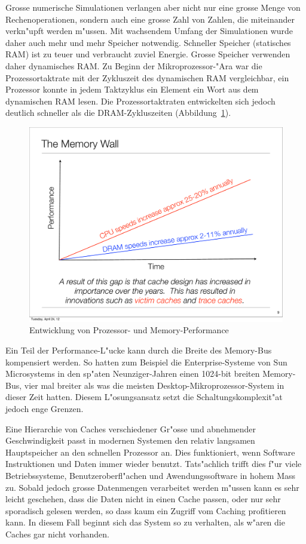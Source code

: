 Grosse numerische Simulationen verlangen aber nicht nur eine grosse
Menge von Rechenoperationen, sondern auch eine grosse Zahl von
Zahlen, die miteinander verkn"upft werden m"ussen.
Mit wachsendem Umfang der Simulationen wurde daher auch mehr
und mehr Speicher notwendig. Schneller Speicher (statisches RAM) ist
zu teuer und verbraucht zuviel Energie. Grosse Speicher verwenden
daher dynamisches RAM. Zu Beginn der Mikroprozessor-"Ara war
die Prozessortaktrate mit der Zykluszeit des dynamischen RAM
vergleichbar, ein Prozessor konnte in jedem Taktzyklus ein
Element ein Wort aus dem dynamischen RAM lesen. Die Prozessortaktraten
entwickelten sich jedoch deutlich schneller als die DRAM-Zykluszeiten
(Abbildung~\ref{memorywall}).
\begin{figure}
\begin{center}
\includegraphics[width=0.6\hsize]{images/memorywall.pdf}
\end{center}
\caption{Entwicklung von Prozessor- und Memory-Performance
\label{memorywall}}
\end{figure}

Ein Teil der Performance-L"ucke kann durch
die Breite des Memory-Bus kompensiert werden. So hatten zum Beispiel die
Enterprise-Systeme von Sun Microsystems in den sp"aten Neunziger-Jahren
einen 1024-bit breiten Memory-Bus, vier mal breiter als was die meisten
Desktop-Mikroprozessor-System in dieser Zeit hatten.
Diesem L"osungsansatz setzt die Schaltungskomplexit"at jedoch enge Grenzen.

Eine Hierarchie von Caches verschiedener Gr"osse und abnehmender
Geschwindigkeit passt in modernen Systemen den relativ langsamen
Hauptspeicher an den schnellen Prozessor an. Dies funktioniert,
wenn Software Instruktionen und Daten immer wieder benutzt.
Tats"achlich trifft dies f"ur viele Betriebssysteme, Benutzeroberfl"achen
und Awendungssoftware in hohem Mass zu.
Sobald jedoch grosse Datenmengen verarbeitet werden m"ussen kann
es sehr leicht geschehen, dass die Daten nicht in einen Cache passen,
oder nur sehr sporadisch gelesen werden, so dass kaum ein Zugriff
vom Caching profitieren kann.
In diesem Fall beginnt sich das System so zu verhalten, als w"aren die
Caches gar nicht vorhanden.


